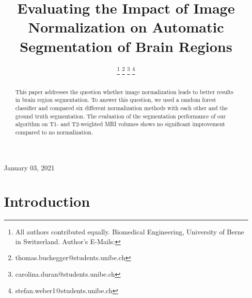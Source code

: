 \documentclass[journal]{IEEEtran}
\begin{document}


\title{Evaluating the Impact of Image Normalization on Automatic Segmentation of Brain Regions}

\author{ 
\and {} 
\and {} 
\thanks{All authors contributed equally. Biomedical Engineering, University of Berne in Switzerland. Author's E-Mails:}%
\thanks{thomas.buchegger@students.unibe.ch}%
\thanks{carolina.duran@students.unibe.ch}%
\thanks{stefan.weber1@students.unibe.ch}}

%
{}
\maketitle
\newpage



\begin{abstract}
	This paper addresses the question whether image normalization leads to better results in brain region segmentation. To answer this question,
	we used a random forest classifier and compared six different normalization methods with each other and the ground truth segmentation. The evaluation of the segmentation performance
	of our algorithm on T1- and T2-weighted MRI volumes shows no significant improvement compared to no normalization. 
\end{abstract}
\hfill January 03, 2021


\section{Introduction}
\end{document}
